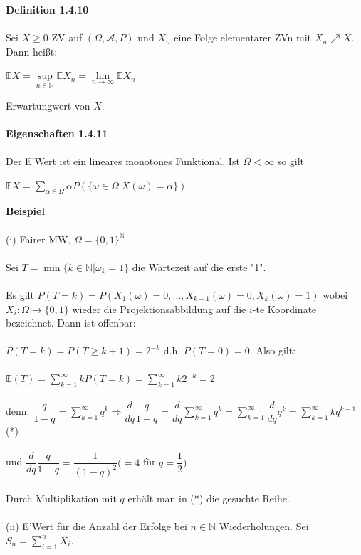 \documentclass[10pt,a4paper]{report}
\numberwithin{equation}{section}
\numberwithin{figure}{section}
\theoremstyle{plain}
\theoremstyle{definition}
\theoremstyle{plain}
\theoremstyle{definition}
\theoremstyle{remark}
\theoremstyle{plain}
\theoremstyle{plain}
\theoremstyle{plain}
\newcommand{\1}{ \mathbb{1} } %
\begin{document}
\textbf{Definition 1.4.10}\\\\
Sei $X\geq 0$ ZV auf $(\Omega,\mathcal{A},P)$ und $X_n$ eine Folge elementarer ZVn mit $X_n\nearrow X$. Dann heißt:
\begin{center}
$\mathbb{E}X=\sup\limits_{n\in \mathbb{N}}\mathbb{E}X_n=\lim\limits_{n \to \infty}\mathbb{E}X_n$
\end{center}
Erwartungwert von $X$.\\\\
\textbf{Eigenschaften 1.4.11}\\\\
Der E'Wert ist ein lineares monotones Funktional. Ist $\Omega<\infty$ so gilt
\begin{center}
$\mathbb{E}X=\sum\limits_{\alpha \in \Omega}\alpha P(\{\omega \in \Omega|X(\omega)=\alpha\})$
\end{center}
\textbf{Beispiel}\\\\
(i) Fairer MW, $\Omega=\{0,1\}^{\mathbb{N}}$\\\\
Sei $T=\min\{k\in \mathbb{N}|\omega_k=1\}$ die Wartezeit auf die erste "1".\\\\
Es gilt $P(T=k)=P(X_1(\omega)=0,\dots,X_{k-1}(\omega)=0,X_k(\omega)=1)$ wobei $X_i:\Omega \to \{0,1\}$ wieder die Projektionsabbildung auf die $i$-te Koordinate bezeichnet. Dann ist offenbar:\\\\
$P(T=k)=P(T\geq k+1)=2^{-k}$ d.h. $P(T=0)=0$. Also gilt:\\\\
$\mathbb{E}(T)=\sum\limits_{k=1}^\infty kP(T=k)=\sum\limits_{k=1}^\infty k2^{-k}=2$\\\\
denn: $\dfrac{q}{1-q}=\sum\limits_{k=1}^\infty q^k \Rightarrow \dfrac{d}{dq}\dfrac{q}{1-q}=\dfrac{d}{dq}\sum\limits_{k=1}^\infty q^k=\sum\limits_{k=1}^\infty \dfrac{d}{dq} q^k=\sum\limits_{k=1}^\infty kq^{k-1}$ (*)\\\\
und $\dfrac{d}{dq}\dfrac{q}{1-q}=\dfrac{1}{(1-q)^2} (=4$ für $q=\dfrac{1}{2})$\\\\
Durch Multiplikation mit $q$ erhält man in (*) die gesuchte Reihe.\\\\
(ii) E'Wert für die Anzahl der Erfolge bei $n \in \mathbb{N}$ Wiederholungen. Sei $S_n=\sum\limits_{i=1}^nX_i$.\\\\
\end{document}
